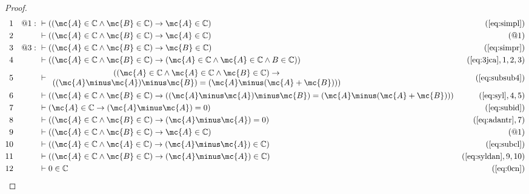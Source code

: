 \begin{proof}
\begin{align}
  1 && @1:\  & \vdash ( ( \mc{A} \in \mathbb{C} \wedge \mc{B} \in \mathbb{C} )
     \rightarrow \mc{A} \in \mathbb{C}
     )&(\mbox{\ref{eq:simpl}})\notag
  \\ 2 &&  & \vdash ( ( \mc{A} \in \mathbb{C} \wedge \mc{B} \in \mathbb{C} ) \rightarrow
     \mc{A} \in \mathbb{C} )&(@1)\notag
  \\ 3 && @3:\  & \vdash ( ( \mc{A} \in \mathbb{C} \wedge \mc{B} \in \mathbb{C} )
     \rightarrow \mc{B} \in \mathbb{C}
     )&(\mbox{\ref{eq:simpr}})\notag
  \\ 4 &&  & \vdash ( ( \mc{A} \in \mathbb{C} \wedge \mc{B} \in \mathbb{C} ) \rightarrow
     ( \mc{A} \in \mathbb{C} \wedge \mc{A} \in \mathbb{C} \wedge B
     \in \mathbb{C} ) )&(\mbox{\ref{eq:3jca}},1,2,3)\notag
  \\ 5 &&  & \vdash 
     \begin{array}{c}
     ( ( \mc{A} \in \mathbb{C} \wedge \mc{A} \in \mathbb{C} \wedge \mc{B} \in
     \mathbb{C} ) \rightarrow \\
     ( ( \mc{A} \minus \mc{A} ) \minus \mc{B} )
     = ( \mc{A} \minus ( \mc{A} + \mc{B} ) )
     )
     \end{array}
     &(\mbox{\ref{eq:subsub4}})\notag
  \\ 6 &&  & \vdash ( ( \mc{A} \in \mathbb{C} \wedge \mc{B} \in \mathbb{C} ) \rightarrow
     ( ( \mc{A} \minus \mc{A} ) \minus \mc{B} ) = ( \mc{A} \minus ( \mc{A} + \mc{B} ) )
     )&(\mbox{\ref{eq:syl}},4,5)\notag
  \\ 7 &&  & \vdash ( \mc{A} \in \mathbb{C} \rightarrow ( \mc{A} \minus \mc{A} ) = 0
     )&(\mbox{\ref{eq:subid}})\notag
  \\ 8 &&  & \vdash ( ( \mc{A} \in \mathbb{C} \wedge \mc{B} \in \mathbb{C} ) \rightarrow
     ( \mc{A} \minus \mc{A} ) = 0 )&(\mbox{\ref{eq:adantr}},7)\notag
  \\ 9 &&  & \vdash ( ( \mc{A} \in \mathbb{C} \wedge \mc{B} \in \mathbb{C} ) \rightarrow
     \mc{A} \in \mathbb{C} )&(@1)\notag
  \\ 10 &&  & \vdash ( ( \mc{A} \in \mathbb{C} \wedge \mc{A} \in \mathbb{C} ) \rightarrow
     ( \mc{A} \minus \mc{A} ) \in \mathbb{C}
     )&(\mbox{\ref{eq:subcl}})\notag
  \\ 11 &&  & \vdash ( ( \mc{A} \in \mathbb{C} \wedge \mc{B} \in \mathbb{C} ) \rightarrow
     ( \mc{A} \minus \mc{A} ) \in \mathbb{C}
     )&(\mbox{\ref{eq:syldan}},9,10)\notag
  \\ 12 &&  & \vdash 0 \in \mathbb{C}&(\mbox{\ref{eq:0cn}})\notag

\end{align}
\end{proof}
